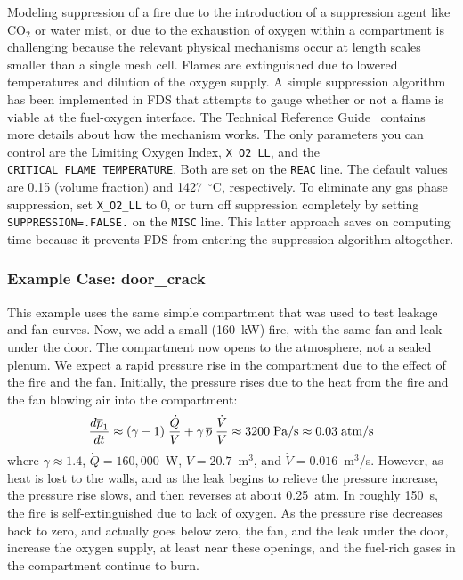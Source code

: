 \documentclass[11pt]{book}
\newcommand{\ct}{\tt\small}
\newcommand{\dQ}{\dot{Q}}
\newcommand{\be}{\begin{equation}}
\newcommand{\ee}{\end{equation}}
\begin{document}
\label{info:extinction}

Modeling suppression of a fire due to the introduction of a suppression
agent like CO$_2$ or water mist, or due to the exhaustion of oxygen
within a compartment is challenging because
the relevant physical mechanisms occur at length scales smaller than a
single mesh cell. Flames are extinguished due to lowered
temperatures and dilution of the oxygen supply. A simple
suppression algorithm has been implemented in FDS that attempts to
gauge whether or not a flame is viable at the fuel-oxygen interface. The Technical Reference Guide~\cite{FDS_Math_Guide}
contains more details about how the mechanism works. The only
parameters you can control are the Limiting
Oxygen Index, {\ct X\_O2\_LL},
and the {\ct CRITICAL\_FLAME\_TEMPERATURE}. Both are
set on the {\ct REAC} line.
The default values are 0.15 (volume fraction) and 1427~$^\circ$C, respectively.
To eliminate any gas phase suppression, set {\ct X\_O2\_LL} to 0, or turn off suppression completely
by setting {\ct SUPPRESSION=.FALSE.} on the {\ct MISC} line. This latter approach saves on computing time because it
prevents FDS from entering the suppression algorithm altogether.

\subsubsection{Example Case: door\_crack}

This example uses the same simple compartment that was used to test leakage and fan curves. Now, we add a small (160~kW) fire, with the same
fan and leak under the door. The compartment now opens to the atmosphere, not a sealed plenum. We expect a rapid pressure rise in the compartment due to the effect of the
fire and the fan. Initially, the pressure rises due to the heat from the fire and the fan blowing air into the compartment:
\be \frac{d \overline{p}_1}{dt} \approx (\gamma - 1) \; \frac{\dQ}{V} + \gamma \, \overline{p} \; \frac{ \dot{V} }{V} \approx 3200 \; \hbox{Pa/s}  \approx 0.03 \; \hbox{atm/s}   \ee
where $\gamma \approx 1.4$, $\dot{Q}=160,000$~W, $V=20.7$~m$^3$, and $\dot{V}=0.016$~m$^3$/s. However, as heat is lost to the walls, and as the leak begins to relieve the
pressure increase, the pressure rise slows, and then reverses at about 0.25~atm. In roughly 150~s, the fire
is self-extinguished due to lack of oxygen. As the pressure rise decreases back to zero, and actually goes below zero, the fan, and the leak under the
door, increase the oxygen supply, at least near these openings, and the fuel-rich gases in the compartment continue to burn.
\end{document}
